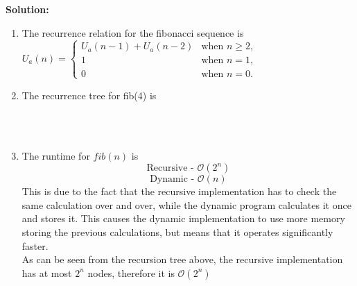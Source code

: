 \documentclass[9pt]{article}
\newcommand{\ben}{\begin{enumerate}}
\newcommand{\een}{\end{enumerate}}
\begin{document}
 \pagebreak
 \phantom{Test}
 \textbf{Solution:}   \\
\ben
  \item The recurrence relation for the fibonacci sequence is \\
      $U_a(n) = \begin{cases}
        U_a(n-1) + U_a(n-2) & \text{when } n\ge2,\\
        1& \text{when } n=1,\\
        0 & \text{when } n=0.
      \end{cases}$

  \item The recurrence tree for fib(4) is \\
   \\\\
  

    \item The runtime for $fib(n)$ is \\
      $$\text{Recursive - }\mathcal{O}(2^n)$$
      $$\text{Dynamic - }\mathcal{O}(n)$$
      This is due to the fact that the recursive implementation has to check the same calculation over and over, while the dynamic program calculates it once and stores it. This causes the dynamic implementation to use more memory storing the previous calculations, but means that it operates significantly faster.\\
      As can be seen from the recursion tree above, the recursive implementation has at most $2^n$ nodes, therefore it is $\mathcal{O}(2^n)$
  \een

\fi

\newpage

\phantom{Test}
\end{document}
